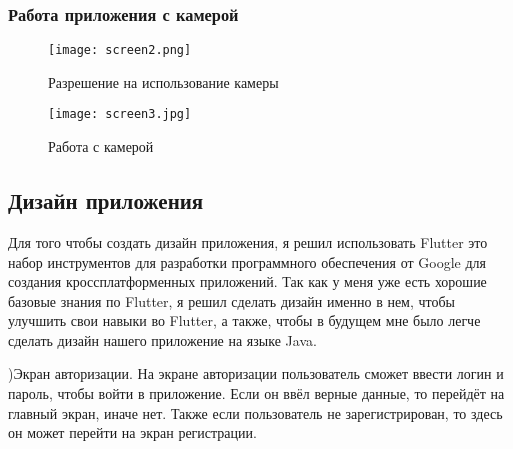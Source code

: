 \subsubsection{Работа приложения с камерой }
\begin{figure}[h!]
\centering
\texttt{[image: screen2.png]}
\caption{Разрешение на использование камеры}
\label{fig:screen2}
\end{figure}

\newpage
\begin{figure}[h!]
\centering
\texttt{[image: screen3.jpg]}
\caption{Работа с камерой}
\label{fig:screen3}
\end{figure}

\newpage
\subsection{Дизайн приложения}
Для того чтобы создать дизайн приложения, я решил использовать Flutter это набор инструментов для разработки программного обеспечения от Google для создания кроссплатформенных приложений. Так как у меня уже есть хорошие базовые знания по Flutter, я решил сделать дизайн именно в нем, чтобы улучшить свои навыки во Flutter, а также, чтобы  в будущем мне было легче сделать дизайн нашего приложение на языке Java. 

)Экран авторизации. На экране авторизации пользователь сможет ввести логин и пароль, чтобы войти в приложение. Если он ввёл верные данные, то перейдёт на главный экран, иначе нет. Также если пользователь не зарегистрирован, то здесь он может перейти на экран регистрации.

